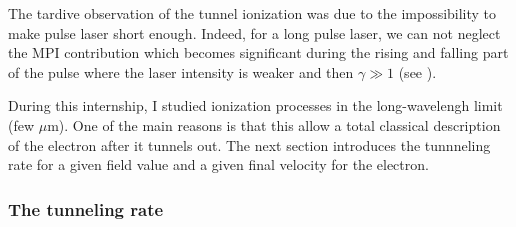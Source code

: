 \documentclass[a4paper]{article}
\begin{document}
The tardive observation of the tunnel ionization was due to the impossibility to make pulse laser short enough. Indeed, for a long pulse laser, we can not neglect the MPI contribution which becomes significant during the rising and falling part of the pulse where the laser intensity is weaker and then $\gamma \gg 1$ (see \cite{Chin_2004}).
\par 
During this internship, I studied ionization processes in the long-wavelengh limit (few $\mu$m). One of the main reasons is that this allow a total classical description of the electron after it tunnels out. The next section introduces the tunnneling rate for a given field value and a given final velocity for the electron.

\subsubsection{The tunneling rate}
\end{document}
